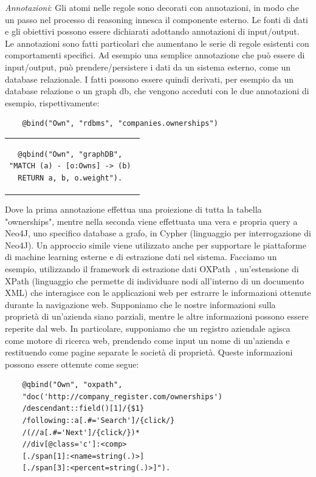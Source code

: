 \emph{Annotazioni}: Gli atomi nelle regole sono decorati con annotazioni, in modo che un passo nel processo di reasoning innesca il componente esterno. Le fonti di dati e gli obiettivi possono essere dichiarati adottando annotazioni di input/output. Le annotazioni sono fatti particolari che aumentano le serie di regole esistenti con comportamenti specifici. Ad esempio una semplice annotazione che può essere di input/output, può prendere/persistere i dati da un sistema esterno, come un database relazionale. I fatti possono essere quindi derivati, per esempio da un database relazione o un graph db, che vengono acceduti con le due annotazioni di esempio, rispettivamente:
\begin{lstlisting}
	@bind("Own", "rdbms", "companies.ownerships")
\end{lstlisting}
\begin{center}
\begin{tabular}{c}
\begin{lstlisting}
@qbind("Own", "graphDB", 
"MATCH (a) - [o:Owns] -> (b) 
RETURN a, b, o.weight"). 
\end{lstlisting}
\end{tabular}
\end{center}
Dove la prima annotazione effettua una proiezione di tutta la tabella "ownerships", mentre nella seconda viene effettuata una vera e propria query a Neo4J, uno specifico database a grafo, in Cypher (linguaggio per interrogazione di Neo4J). \newline
Un approccio simile viene utilizzato anche per supportare le piattaforme di machine learning esterne e di estrazione dati nel sistema. Facciamo un esempio, utilizzando il framework di estrazione dati OXPath~\cite{furche2013oxpath}, un'estensione di XPath (linguaggio che permette di individuare nodi all'interno di un documento XML) che interagisce con le applicazioni web per estrarre le informazioni ottenute durante la navigazione web. \newline
Supponiamo che le nostre informazioni sulla proprietà di un'azienda siano parziali, mentre le altre informazioni possono essere reperite dal web. In particolare, supponiamo che un registro aziendale agisca come motore di ricerca web, prendendo come input un nome di un'azienda e restituendo come pagine separate le società di proprietà. Queste informazioni possono essere ottenute come segue:
\begin{lstlisting}
	@qbind("Own", "oxpath", 
	"doc('http://company_register.com/ownerships') 
	/descendant::field()[1]/{$1} 
	/following::a[.#='Search']/{click/} 
	/(//a[.#='Next']/{click/})* 
	//div[@class='c']:<comp> 
	[./span[1]:<name=string(.)>] 
	[./span[3]:<percent=string(.)>]"). 
\end{lstlisting}
